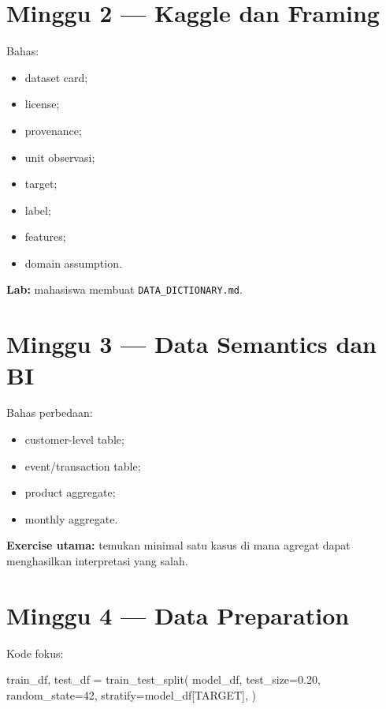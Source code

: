 \documentclass[
  indonesian,
  letterpaper,
  DIV=11,
  numbers=noendperiod]{scrreprt}
\newenvironment{Shaded}{\begin{snugshade}}{\end{snugshade}}
\newcommand{\DecValTok}[1]{\textcolor[rgb]{0.68,0.00,0.00}{#1}}
\newcommand{\FloatTok}[1]{\textcolor[rgb]{0.68,0.00,0.00}{#1}}
\newcommand{\NormalTok}[1]{\textcolor[rgb]{0.00,0.23,0.31}{#1}}
\newcommand{\OperatorTok}[1]{\textcolor[rgb]{0.37,0.37,0.37}{#1}}
\providecommand{\tightlist}{%
  \setlength{\itemsep}{0pt}\setlength{\parskip}{0pt}}
\begin{document}
\section{Minggu 2 --- Kaggle dan
Framing}\label{minggu-2-kaggle-dan-framing}

Bahas:

\begin{itemize}
\tightlist
\item
  dataset card;
\item
  license;
\item
  provenance;
\item
  unit observasi;
\item
  target;
\item
  label;
\item
  features;
\item
  domain assumption.
\end{itemize}

\textbf{Lab:} mahasiswa membuat \texttt{DATA\_DICTIONARY.md}.

\section{Minggu 3 --- Data Semantics dan
BI}\label{minggu-3-data-semantics-dan-bi}

Bahas perbedaan:

\begin{itemize}
\tightlist
\item
  customer-level table;
\item
  event/transaction table;
\item
  product aggregate;
\item
  monthly aggregate.
\end{itemize}

\textbf{Exercise utama:} temukan minimal satu kasus di mana agregat
dapat menghasilkan interpretasi yang salah.

\section{Minggu 4 --- Data Preparation}\label{minggu-4-data-preparation}

Kode fokus:

\begin{Shaded}
\begin{Highlighting}[]
\NormalTok{train\_df, test\_df }\OperatorTok{=}\NormalTok{ train\_test\_split(}
\NormalTok{    model\_df,}
\NormalTok{    test\_size}\OperatorTok{=}\FloatTok{0.20}\NormalTok{,}
\NormalTok{    random\_state}\OperatorTok{=}\DecValTok{42}\NormalTok{,}
\NormalTok{    stratify}\OperatorTok{=}\NormalTok{model\_df[TARGET],}
\NormalTok{)}
\end{Highlighting}
\end{Shaded}
\end{document}
